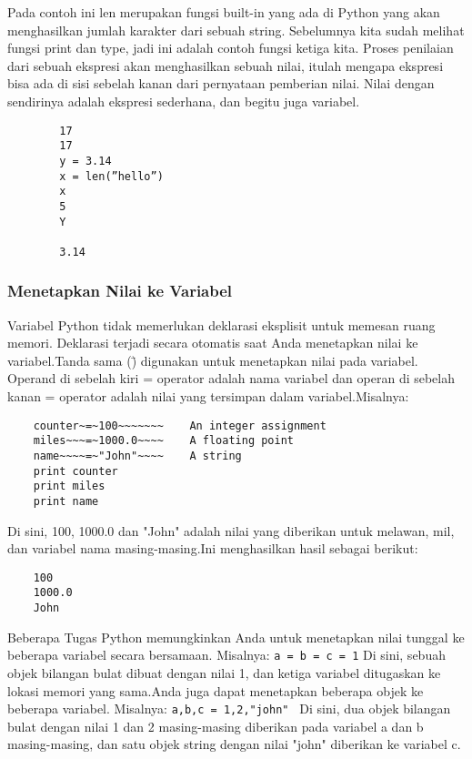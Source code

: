 Pada contoh ini len merupakan fungsi built-in yang ada di Python yang akan menghasilkan jumlah karakter dari sebuah string. Sebelumnya kita sudah melihat fungsi print dan type, jadi ini adalah contoh fungsi ketiga kita.
Proses penilaian dari sebuah ekspresi akan menghasilkan sebuah nilai, itulah mengapa ekspresi bisa ada di sisi sebelah kanan dari pernyataan pemberian nilai. Nilai dengan sendirinya adalah ekspresi sederhana, dan begitu juga variabel.
	\begin{verbatim}
		17
		17 
		y = 3.14 
		x = len(”hello”) 
		x 
		5 
		Y

		3.14
	\end{verbatim}
	
\subsubsection{Menetapkan Nilai ke Variabel}
Variabel Python tidak memerlukan deklarasi eksplisit untuk memesan ruang memori. Deklarasi terjadi secara otomatis saat Anda menetapkan nilai ke variabel.Tanda sama (\=) digunakan untuk menetapkan nilai pada variabel. 
Operand di sebelah kiri = operator adalah nama variabel dan operan di sebelah kanan = operator adalah nilai yang tersimpan dalam variabel.Misalnya:
\begin{verbatim}
	counter~=~100~~~~~~~    An integer assignment 
	miles~~~=~1000.0~~~~    A floating point 
	name~~~~=~"John"~~~~    A string 
	print counter 
	print miles 
	print name
\end{verbatim}
Di sini, 100, 1000.0 dan "John" adalah nilai yang diberikan untuk melawan, mil, dan variabel nama masing-masing.Ini menghasilkan hasil sebagai berikut:
\begin{verbatim}
	100 
	1000.0
	John 
\end{verbatim}
Beberapa Tugas Python memungkinkan Anda untuk menetapkan nilai tunggal ke beberapa variabel secara bersamaan. 
Misalnya:
	\verb|a = b = c = 1|
Di sini, sebuah objek bilangan bulat dibuat dengan nilai 1, dan ketiga variabel ditugaskan ke lokasi memori yang sama.Anda juga dapat menetapkan beberapa objek ke beberapa variabel. 
Misalnya:
	\verb|a,b,c = 1,2,"john" |
Di sini, dua objek bilangan bulat dengan nilai 1 dan 2 masing-masing diberikan pada variabel a dan b masing-masing, dan satu objek string dengan nilai "john" diberikan ke variabel c. 

